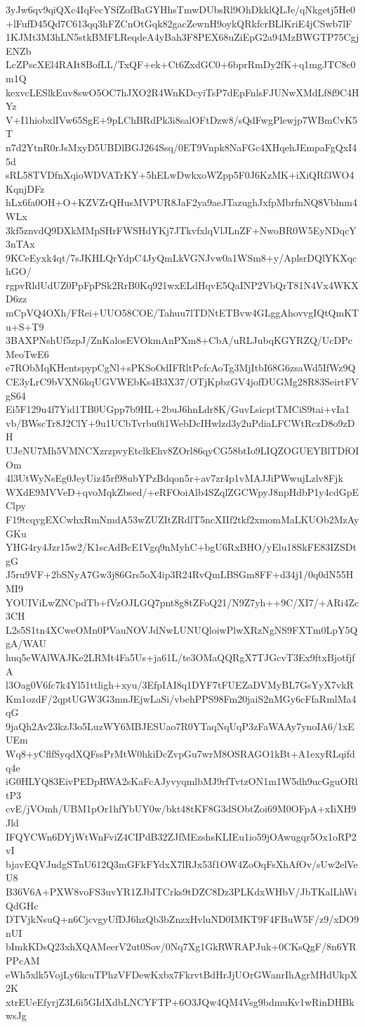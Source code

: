 3yJw6qv9qiQXc4IqFecYSfZofBaGYHhsTmwDUbsRl9OhDkklQLJe/qNkgetj5He0
+lFufD45Qd7C613qq3hFZCnOtGqk82gacZewnH9oykQRkfcrBLlKriE4jCSwb7lF
1KJMt3M3hLN5stkBMFLReqdeA4yBah3F8PEX68uZiEpG2a94MzBWGTP75CgjENZb
LcZPscXEl4RAIt8BofLL/TxQF+ek+Ct6ZxdGC0+6bprRmDy2fK+q1mgJTC8c0m1Q
kexvcLESlkEuv8swO5OC7hJXO2R4WnKDcyiTsP7dEpFnlsFJUNwXMdLf8f9C4HYz
V+I1hiobxlIVw65SgE+9pLChBRdPk3i8salOFtDzw8/sQdFwgPlewjp7WBmCvK5T
n7d2YtnR0rJsMxyD5UBDlBGJ264Ssq/0ET9Vnpk8NaFGc4XHqehJEmpaFgQxI45d
sRL58TVDfnXqioWDVATrKY+5hELwDwkxoWZpp5F0J6KzMK+iXiQRf3WO4KqnjDFz
hLx6fa0OH+O+KZVZrQHusMVPUR8JaF2ya9aeJTazughJxfpMbrfnNQ8Vblnm4WLx
3kf5znvdQ9DXkMMpSHrFWSHdYKj7JTkvfxlqVlJLnZF+NwoBR0W5EyNDqcY3nTAx
9KCeEyxk4qt/7sJKHLQrYdpC4JyQmLkVGNJvw0a1WSm8+y/AplsrDQlYKXqchGO/
rgpvRldUdUZ0PpFpPSk2RrB0Kq921wxELdHqvE5QaINP2VbQrT81N4Vx4WKXD6zz
mCpVQ4OXh/FRei+UUO58COE/Tahuu7lTDNtETBvw4GLggAhovvgIQtQmKTu+S+T9
3BAXPNshUf5zpJ/ZnKalosEVOkmAnPXm8+CbA/uRLJubqKGYRZQ/UcDPcMeoTwE6
e7RObMqKHentspypCgNl+sPKSoOdIFRltPcfcAoTg3MjItbI68G6zsaWd5IfWz9Q
CE3yLrC9bVXN6kqUGVWEbKs4B3X37/OTjKpbzGV4jofDUGMg28R83SeirtFVgS64
Ei5F129u4f7Yid1TB0UGpp7b9HL+2buJ6hnLdr8K/GuvLsicptTMCiS9tai+vIa1
vb/BWscTr8J2ClY+9u1UCbTvrbu0i1WebDcIHwlzd3y2uPdiaLFCWtRczD8o9zDH
UJeNU7Mh5VMNCXzrzpvyEtclkEhv8ZOrl86qyCG58btIo9LIQZOGUEYBlTDfOIOm
4l3UtWyNsEg0JeyUiz45rf98ubYPzBdqon5r+av7zr4p1vMAJJiPWwujLzlv8Fjk
WXdE9MVVeD+qvoMqkZbsed/+eRFOoiAlb4SZqlZGCWpyJ8npHdbP1y4cdGpEClpy
F19tcqygEXCwhxRmNmdA53wZUZItZRdlT5ncXIIf2tkf2xmomMaLKUOb2MzAyGKu
YHG4ry4Jzr15w2/K1scAdBcE1Vgq9nMyhC+bgU6RxBHO/yElu18SkFE83IZSDtgG
J5ru9VF+2bSNyA7Gw3j86Grs5oX4ip3R24RvQmLBSGm8FF+d34j1/0q0dN55HMI9
YOUIViLwZNCpdTb+fVzOJLGQ7pnt8g8tZFoQ21/N9Z7yh++9C/XI7/+ARi4Zc3CH
L2s5S1tn4XCweOMn0PVauNOVJdNwLUNUQloiwPlwXRzNgNS9FXTm0LpY5QgA/WAU
huq5eWAlWAJKe2LRMt4Fa5Us+ja61L/te3OMaQQRgX7TJGcvT3Ex9ftxBjotfjfA
l3Oag0V6fc7k4Yl51ttligh+xyu/3EfpIAI8q1DYF7tFUEZaDVMyBL7GsYyX7vkR
Km1ozdF/2qptUGW3G3mnJEjwLaSi/vbehPPS98Fm20jaiS2nMGy6cFfaRmlMa4qG
9jaQh2Av23kzJ3o5LuzWY6MBJESUao7R0YTaqNqUqP3zFaWAAy7ynoIA6/1xEUEm
Wq8+yCflfSyqdXQFssPrMtW0hkiDcZvpGu7wrM8OSRAGO1kBt+A1exyRLqifdq4e
iG0HLYQ83EivPEDpRWA2sKaFcAJyvyqmlbMJ9rfTvtzON1m1W5dh9ucGguORltP3
cvE/jVOmh/UBM1pOr1hfYbUY0w/bkt48tKF8G3dSObtZoi69M0OFpA+xIiXH9Jld
IFQYCWn6DYjWtWnFviZ4CIPdB32ZJfMEzshsKLIEu1io59jOAwugqr5Ox1oRP2vI
bjavEQVJudgSTnU612Q3mGFkFYdxX7lRJx53f1OW4ZoOqFsXhAfOv/sUw2elVeU8
B36V6A+PXW8voFS3uvYR1ZJbITCrks9tDZC8Dz3PLKdxWHbV/JbTKalLhWiQdGHc
DTVjkNsuQ+n6CjcvgyUfDJ6hzQb3bZnzxHvluND0IMKT9F4FBuW5F/z9/xDO9nUI
bImkKDsQ23xhXQAMeerV2ut0Sov/0Nq7Xg1GkRWRAPJuk+0CKsQgF/8n6YRPPcAM
eWh5xlk5VojLy6kcuTPhzVFDewKxbx7FkrvtBdHrJjUOrGWanrIhAgrMHdUkpX2K
xtrEUeEfyrjZ3L6i5GIdXdbLNCYFTP+6O3JQw4QM4Vsg9bdmuKv1wRinDHBkwsJg
